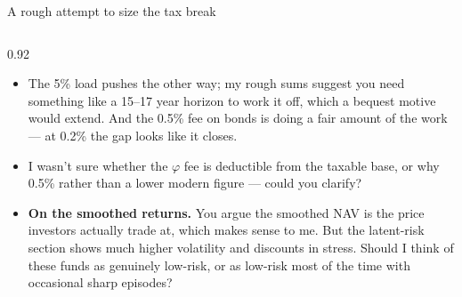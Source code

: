 \documentclass[aspectratio=169,10pt]{beamer}
\newcommand{\card}[1]{%
  \begin{columns}\begin{column}{0.92\textwidth}#1\end{column}\end{columns}}
\newcommand{\lead}[1]{\textbf{#1}}
\begin{document}
\begin{frame}{A rough attempt to size the tax break}
  \vfill\centering
  \\[1.2ex]
  \card{\footnotesize
  \begin{itemize}\setlength{\itemsep}{0.7ex}
     \item The 5\% load pushes the other
        way; my rough sums suggest you need something like a 15--17 year horizon
        to work it off, which a bequest motive would extend. And the 0.5\% fee on
        bonds is doing a fair amount of the work --- at 0.2\% the gap looks like
        it closes.
      \item I wasn't sure whether the $\varphi$ fee is deductible from the
        taxable base, or why 0.5\% rather than a lower modern figure --- could
        you clarify?
      \item \lead{On the smoothed returns.} You argue the smoothed NAV is the
        price investors actually trade at, which makes sense to me. But the
        latent-risk section shows much higher volatility and discounts in stress.
        Should I think of these funds as genuinely low-risk, or as low-risk most
        of the time with occasional sharp episodes?
  \end{itemize}}
  \vfill
\end{frame}

\end{document}

